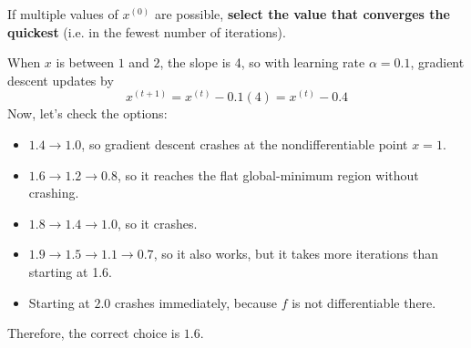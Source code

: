 \documentclass[11pt]{article}
\begin{document}
\begin{prob}
\begin{subprob}
If multiple values of $x^{(0)}$ are possible, \textbf{select the value that converges the quickest} (i.e. in the fewest number of iterations). \\

    
\begin{solution}
When $x$ is between $1$ and $2$, the slope is 4, so with learning rate $\alpha = 0.1$, gradient descent updates by
\[
x^{(t+1)} = x^{(t)} - 0.1(4) = x^{(t)} - 0.4
\]
Now, let's check the options:
\begin{itemize}
    \item $1.4 \to 1.0$, so gradient descent crashes at the nondifferentiable point $x=1$.
    \item $1.6 \to 1.2 \to 0.8$, so it reaches the flat global-minimum region without crashing.
    \item $1.8 \to 1.4 \to 1.0$, so it crashes.
    \item $1.9 \to 1.5 \to 1.1 \to 0.7$, so it also works, but it takes more iterations than starting at 1.6.
    \item Starting at $2.0$ crashes immediately, because $f$ is not differentiable there.
\end{itemize}
Therefore, the correct choice is $\boxed{1.6}$.
\end{solution}
\end{subprob}

\end{prob}

\newpage
\end{document}
